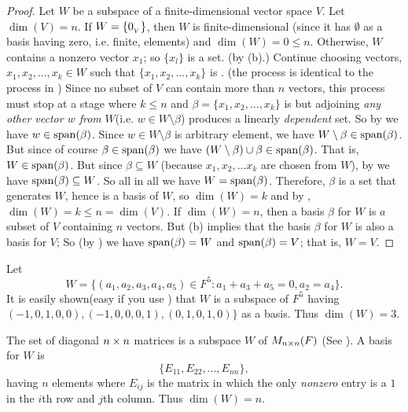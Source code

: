 \begin{proof}
Let \(W\) be a subspace of a finite-dimensional vector space \(V\).
Let \(\dim(V) = n\).
If \(W = \{ 0_{_V} \}\), then \(W\) is finite-dimensional
(since it has \(\emptyset\) as a basis having zero, i.e. finite, elements)
and \(\dim(W) = 0 \le n\).
Otherwise, \(W\) contains a nonzero vector \(x_1\);
so \(\{ x_l \}\) is a \LID{} set. (by (b).)
Continue choosing vectors, \(x_1, x_2 , ..., x_k \in W\) such that \(\{ x_1, x_2, ..., x_k \}\) is \LID{}.
(the process is identical to the process in )
Since no \LID{} subset of \(V\) can contain more than \(n\) vectors, this process must stop at a stage where \(k \le n\)  and \(\beta = \{ x_1, x_2, ..., x_k \}\) is \LID{} but adjoining \emph{any other vector \(w\) from} \(W\)(i.e. \(w \in W \setminus \beta\)) produces a linearly \emph{dependent} set.
So by  we have \(w \in \operatorname{span}(\beta)\).
Since \(w \in W \setminus \beta\) is arbitrary element, we have \(W \setminus \beta \in \operatorname{span}(\beta)\).
But since of course \(\beta \in \operatorname{span}(\beta)\) we have \((W \setminus \beta) \cup \beta \in \operatorname{span}(\beta)\).
That is, \(W \in \operatorname{span}(\beta)\).
But since \(\beta \subseteq W\) (because \(x_1, x_2, ... x_k\) are chosen from \(W\)), by  we have \(\operatorname{span}(\beta) \subseteq W\).
So all in all we have \(W = \operatorname{span}(\beta)\).
Therefore, \(\beta\) is a \LID{} set that generates \(W\), hence is a basis of \(W\), so \(\dim(W) = k\) and by , \(\dim(W) = k \le n = \dim(V)\).
If \(\dim(W) = n\), then a basis \(\beta\) for \(W\) is \(a\) \LID{} subset of \(V\) containing \(n\) vectors.
But (b) implies that the basis \(\beta\) for \(W\) is also a basis for \(V\);
So (by ) we have \(\operatorname{span}(\beta) = W\) and \(\operatorname{span}(\beta) = V\);
that is, \(W = V\).
\end{proof}

\begin{example} \label{example 1.6.18}
Let
\[
    W = \{ ( a_1, a_2, a_3, a_4, a_5) \in F^5 : a_1 + a_3 + a_5 = 0, a_2 = a_4 \}.
\]
\sloppy It is easily shown(easy if you use ) that \(W\) is a subspace of \(F^5\) having \( (-1, 0, 1, 0, 0), (-1, 0, 0, 0, 1), (0, 1, 0,1, 0)\}\) as a basis.
Thus \(\dim(W) = 3\).
\end{example}

\begin{example} \label{example 1.6.19}
The set of diagonal \(n \times n\) matrices is a subspace \(W\) of \(M_{n \times n}(F)\) (See ).
A basis for \(W\) is
\[
    \{ E_{11}, E_{22}, ..., E_{nn} \},
\]
having \(n\) elements where \(E_{ij}\) is the matrix in which the only \emph{nonzero} entry is a \(1\) in the \(i\)th row and \(j\)th column.
Thus \(\dim(W) = n\).
\end{example}

